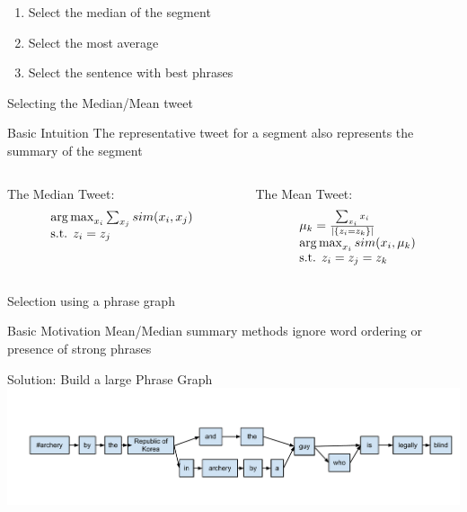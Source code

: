 \documentclass[compress]{beamer}
\DeclareMathOperator*{\argmax}{arg\,max}
\begin{document}
\begin{frame}[fragile]
\pause

\begin{block}{}
    \begin{enumerate}[<+->]
        \item Select the median of the segment \cite{takamura11SummaryStream}
        \item Select the most average 
        \item Select the sentence with best phrases \cite{nichols12SummarySports}
    \end{enumerate}
\end{block}

\end{frame}

\begin{frame}{Selecting the Median/Mean tweet}
\begin{block}{Basic Intuition}
The representative tweet for a segment also represents the summary of the segment
\end{block}

\begin{columns}

\begin{column}[1]{5cm}
The Median Tweet:
\[
\begin{array}{l l}
\argmax_{x_i} \sum_{x_j} sim(x_i, x_j) \\
\text{s.t. } z_i = z_j \\
\end{array}
\]
\end{column}

\begin{column}[2]{5cm}
The Mean Tweet:
\[
\begin{array}{l l}
\mu_k = \frac{\sum_{x_i} x_i}{|\{z_i = z_k\}|} \\
\argmax_{x_i} sim(x_i, \mu_k) \\
\text{s.t. } z_i = z_j = z_k \\
\end{array}
\]
\end{column}

\end{columns}

\end{frame}

\begin{frame}{Selection using a phrase graph}
\begin{block}{Basic Motivation}
Mean/Median summary methods ignore word ordering or presence of strong phrases
\end{block}
\pause
Solution: Build a large Phrase Graph
\includegraphics[width=\textwidth,height=.50\textheight]{example-phrase-graph.pdf}
\end{frame}
\end{document}
